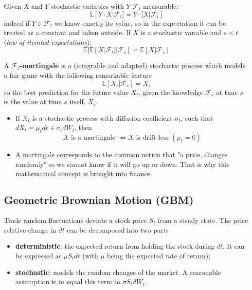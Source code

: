 \documentclass[12pt,a4paper]{book}
\begin{document}
Given $X$ and $Y$ stochastic variables with $Y$ $\mathcal{F}_t$-measurable:
\begin{equation*}
\mathbb{E}[Y\cdot X|\mathcal{F}_t] =  Y\cdot\mathbb[X|\mathcal{F}_t]
\end{equation*}
indeed if $Y\in\mathcal{F}_t$ we know exactly its value, so in the expectation it can be treated as a constant and taken outside.
If $X$ is a stochastic variable and $s<t$ (\emph{law of iterated expectations}):
\begin{equation*}
\mathbb{E}[\mathbb{E}[X|\mathcal{F}_t]|\mathcal{F}_s] = \mathbb{E}[X|\mathcal{F}_s]
\end{equation*}

A \textbf{$\mathcal{F}_t$-martingale} is a (integrable and adapted) stochastic process which models a fair game with the following remarkable feature
\begin{equation}
\mathbb{E}[X_t|\mathcal{F}_s] = X_s
\end{equation}
so the best prediction for the future value $X_t$, given the knowledge $\mathcal{F}_s$ at time $s$ is the value at time $s$ itself, $X_s$.
		
\begin{itemize}
\item If $X_t$ is a stochastic process with diffusion coefficient $\sigma_t$, such that %
$dX_t=\mu_t dt+\sigma_t dW_t$, then 
\begin{equation*}
X\text{ is a martingale } \iff X\text{ is drift-less } (\mu_t=0)
\end{equation*}
\item A martingale corresponds to the common notion that "a price, changes randomly" so we cannot know if it will go up or down. That is why this mathematical concept is brought into finance.
\end{itemize}	
	
\subsection{Geometric Brownian Motion (GBM)}
Trade random fluctuations deviate a stock price $S_t$ from a steady state.
The price relative change in $dt$ can be decomposed into two parts
\begin{itemize}
\item \textbf{deterministic}: the expected return from holding the stock during $dt$. It can be expressed as $\mu S_tdt$ (with $\mu$ being the expected rate of return);
\item \textbf{stochastic}: models the random changes of the market. A reasonable assumption is to equal this term to $\sigma S_t dW_t$. 
\end{itemize}
\end{document}
